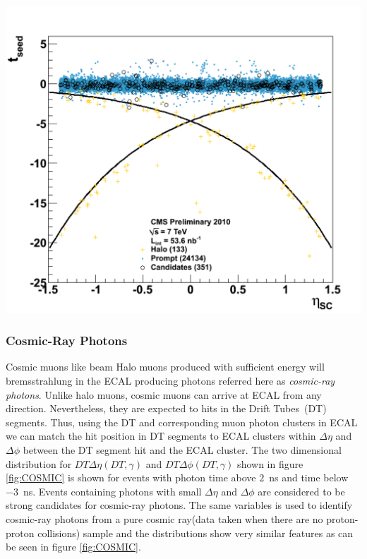 \begin{center}
\includegraphics[scale=0.2]{THESISPLOTS/Figure_016-c.pdf}
\label{fig:HALO}
\end{center} 



\subsubsection{Cosmic-Ray Photons}
Cosmic muons like beam Halo muons produced with sufficient energy  will bremsstrahlung in the ECAL producing photons referred here as \textit{cosmic-ray photons}. Unlike halo muons, cosmic muons can arrive at ECAL from any direction. Nevertheless, they are expected to hits in the Drift Tubes~(DT) segments. Thus, using the DT and corresponding  muon photon clusters in ECAL we can match the  hit position in DT segments to ECAL clusters within $\Delta\eta$ and $\Delta\phi$ between the DT segment hit and the ECAL cluster. The two dimensional distribution for $DT\Delta\eta(DT,\gamma)$ and $DT\Delta\phi(DT,\gamma)$ shown in figure \ref{fig:COSMIC} is shown for events with photon time above $2$~ns and time below $-3$~ns. Events containing photons with small $\Delta\eta$ and $\Delta\phi$ are considered to be strong candidates for cosmic-ray photons. The same variables is used to identify cosmic-ray photons from a pure cosmic ray(data taken when there are no proton-proton collisions) sample and the distributions show very similar features as can be seen in figure 
\ref{fig:COSMIC}.

